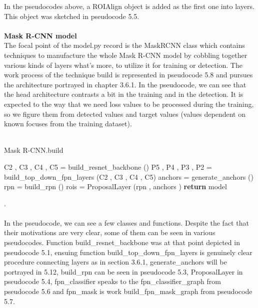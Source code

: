 In the pseudocodes above, a ROIAlign object is added as the first one into layers. This object was sketched in pseudocode 5.5.
\\
\\
\textbf{Mask R-CNN model}
\\
The focal point of the model.py record is the MaskRCNN class which contains techniques to manufacture the whole Mask R-CNN model by cobbling together various kinds of layers 
what's more, to utilize it for training or detection. The work process of the technique build is represented in pseudocode 5.8 and pursues 
the architecture portrayed in chapter 3.6.1. In the pseudocode, we can see that the head architecture contrasts a bit in the training and in the detection. It is expected to 
the way that we need loss values to be processed during the training, so we figure them from detected values and target values (values dependent on known focuses from 
the training dataset).
\\
\\
\begin{algorithm}[H]
  \caption{Mask R-CNN.build}
  \SetAlgoLined
  \DontPrintSemicolon
 C2 , C3 , C4 , C5 = build\_resnet\_backbone ()\;
 P5 , P4 , P3 , P2 = build\_top\_down\_fpn\_layers (C2 , C3 , C4 , C5)\;
 anchors = generate\_anchors ()\;
 rpn = build\_rpn ()\;
 rois = ProposalLayer (rpn , anchors )\;
 \textbf{return} model\;
\end{algorithm}
.\\
\\ 
In the pseudocode, we can see a few classes and functions. Despite the fact that their motivations are very clear, some of them can be seen in various pseudocodes. Function
build\_resnet\_backbone was at that point depicted in pseudocode 5.1, ensuing function build\_top\_down\_fpn\_layers is genuinely clear procedure connecting layers 
as in section 3.6.1, generate\_anchors will be portrayed in 5.12, build\_rpn can be seen in pseudocode 5.3, ProposalLayer in pseudocode 5.4, fpn\_classifier speaks to the fpn\_classifier\_graph from pseudocode 5.6 and fpn\_mask is work 
build\_fpn\_mask\_graph from pseudocode 5.7.
